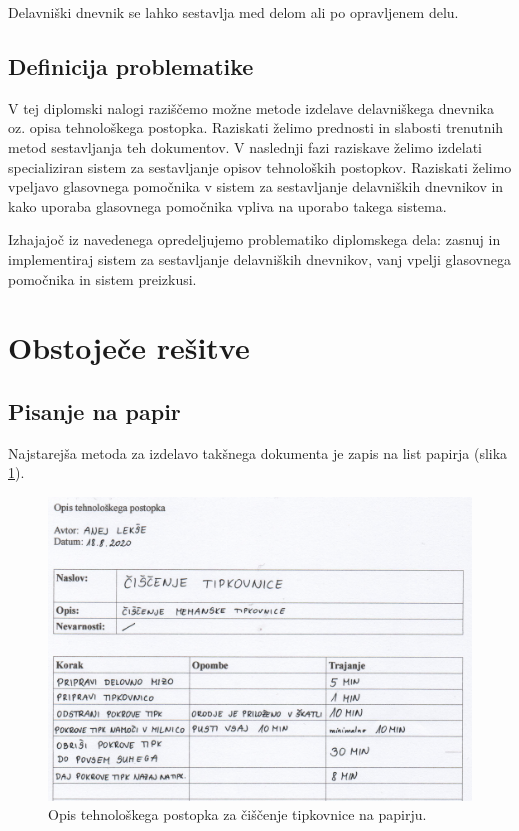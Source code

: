 \documentclass[a4paper, 12pt]{book}
\begin{document}

Delavniški dnevnik se lahko sestavlja med delom ali po opravljenem delu.

\subsection{Definicija problematike}

V tej diplomski nalogi raziščemo možne metode izdelave delavniškega dnevnika oz. opisa tehnološkega postopka.
Raziskati želimo prednosti in slabosti trenutnih metod sestavljanja teh dokumentov.
V naslednji fazi raziskave želimo izdelati specializiran sistem za sestavljanje opisov tehnoloških postopkov.
Raziskati želimo vpeljavo glasovnega pomočnika v sistem za sestavljanje delavniških dnevnikov in kako uporaba glasovnega pomočnika vpliva na uporabo takega sistema.


Izhajajoč iz navedenega opredeljujemo problematiko diplomskega dela: zasnuj in implementiraj sistem za sestavljanje delavniških dnevnikov, vanj vpelji glasovnega pomočnika in sistem preizkusi.

\section{Obstoječe rešitve}

\subsection{Pisanje na papir}

Najstarejša metoda za izdelavo takšnega dokumenta je zapis na list papirja (slika \ref{paper}).

\begin{figure}[H]
\begin{center}
\includegraphics[width=13.5cm]{report_paper_small}
\end{center}
\caption{Opis tehnološkega postopka za čiščenje tipkovnice na papirju.}
\label{paper}
\end{figure}
\end{document}

